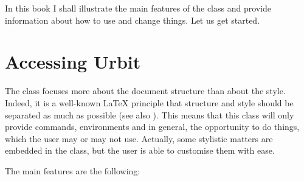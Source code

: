 \begin{enumerate}

In this book I shall illustrate the main features of the class and
provide information about how to use and change things. Let us get
started.

\section{Accessing Urbit}

The  class focuses more about the document structure than
about the style. Indeed, it is a well-known \LaTeX\xspace principle that
structure and style should be separated as much as possible (see also
). This means that this class will only provide
commands, environments and in general, the opportunity to do things,
which the user may or may not use. Actually, some stylistic matters are
embedded in the class, but the user is able to customise them with ease.

The main features are the following:


\end{enumerate}
